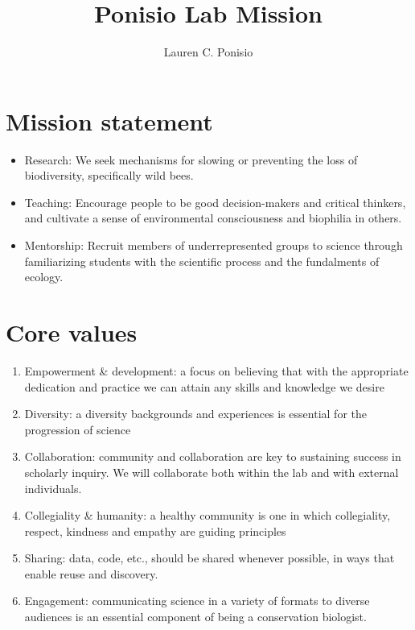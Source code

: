 \documentclass[12pt]{article}
\title{Ponisio Lab Mission}
\author{Lauren C. Ponisio}
\begin{document}
\maketitle

\section{Mission statement}
\begin{itemize}
\item Research: We seek mechanisms for slowing or preventing the loss
  of biodiversity, specifically wild bees. 
\item Teaching: Encourage people to be good decision-makers
and critical thinkers, and cultivate a sense of environmental
consciousness and biophilia in others.
\item Mentorship: Recruit members of underrepresented groups to
  science through familiarizing students with the scientific process
  and the fundalments of ecology.
\end{itemize}

\section{Core values}

\begin{enumerate}
\item Empowerment \& development: a focus on believing that with the
  appropriate dedication and practice we can attain any skills and
  knowledge we desire
\item Diversity: a diversity backgrounds and experiences is essential
  for the progression of science
\item Collaboration: community and collaboration are key to sustaining
  success in scholarly inquiry. We will collaborate both within the
  lab and with external individuals.
\item Collegiality \& humanity: a healthy community is one in which
  collegiality, respect, kindness and empathy are guiding principles
\item Sharing: data, code, etc., should be shared whenever possible,
  in ways that enable reuse and discovery.
\item Engagement: communicating science in a variety of formats to
  diverse audiences is an essential component of being a conservation
  biologist.
\end{enumerate}
\end{document}
